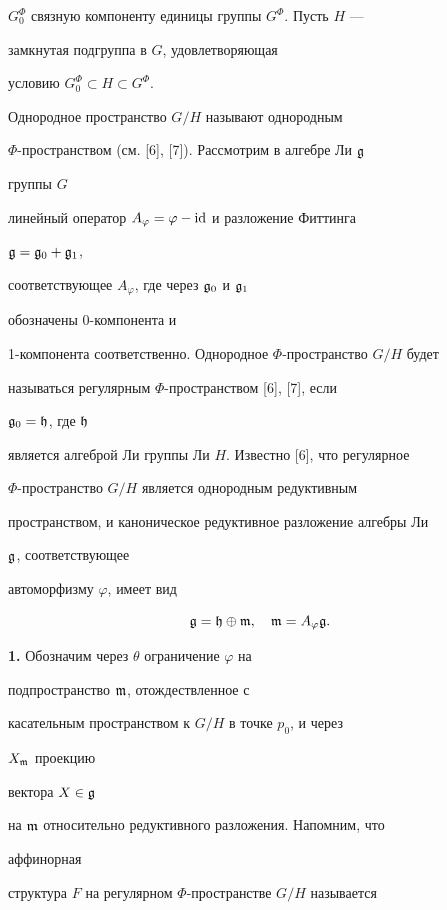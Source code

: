 $G^\Phi_0$ связную компоненту единицы группы $G^\Phi$. Пусть $H$ --- 


замкнутая подгруппа в $G$, удовлетворяющая 


условию $G^\Phi_0\subset H\subset G^\Phi$. 


Однородное пространство $G/H$ называют однородным  


$\Phi$-пространством (см. [6], [7]). Рассмотрим в алгебре Ли $\frak g$ 


группы $G$ 


линейный оператор $A_\varphi=\varphi-\operatorname{id}$ и разложение Фиттинга 


$\frak g=\frak g_0+\frak g_1$, 


соответствующее $A_\varphi$, где через $\frak g_0$ и $\frak g_1$ 


обозначены 0-компонента и 


1-компонента соответственно. Однородное $\Phi$-пространство $G/H$ будет 


называться регулярным $\Phi$-пространством [6], [7], если 


$\frak g_0=\frak h$, где $\frak h$ 


является алгеброй Ли группы Ли $H$. Известно [6], что регулярное 


$\Phi$-пространство $G/H$ является однородным редуктивным 


пространством, и каноническое редуктивное разложение алгебры Ли 


$\frak g$, соответствующее 


автоморфизму $\varphi$, имеет вид 


$$ 


\frak g=\frak h\oplus\frak m,\quad 


\frak m=A_\varphi\frak g. 


$$ 


 


{\bf 1.} Обозначим через $\theta$ ограничение $\varphi$ на 


подпространство $\frak m$, отождествленное с 


касательным пространством к $G/H$ в точке $p_0$, и через 


$X_{\frak m}$ проекцию 


вектора $X\in\frak g$ 


на $\frak m$ относительно редуктивного разложения. Напомним, что 


аффинорная 


структура $F$ на регулярном $\Phi$-пространстве $G/H$ называется 


